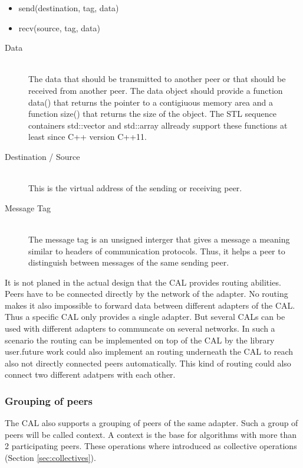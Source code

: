 \begin{itemize}
  \item send(destination, tag, data)
  \item recv(source, tag, data)
\end{itemize}

\begin{description}
\item[Data] \hfill \\
  The data that should be transmitted to
  another peer or that should be received from another peer.  The data
  object should provide a function data() that returns the pointer to a
  contigiuous memory area and a function size() that returns the size
  of the object. The STL sequence containers std::vector and
  std::array allready support these functions at least since C++ version
  C++11.
\item[Destination / Source] \hfill \\
  This is the virtual address of the sending or receiving peer.
\item[Message Tag] \hfill \\
  The message tag is an unsigned interger that gives
  a message a meaning similar to headers of communication
  protocols. Thus, it helps a peer to distinguish between messages of
  the same sending peer.
\end{description}

It is not planed in the actual design that the CAL provides routing
abilities. Peers have to be connected directly by the network of the
adapter. No routing makes it also impossible to forward data between
different adapters of the CAL. Thus a specific CAL only provides a
single adapter. But several CALs can be used with different adapters
to communcate on several networks. In such a scenario the routing can
be implemented on top of the CAL by the library user.future work could
also implement an routing underneath the CAL to reach also not
directly connected peers automatically. This kind of routing
could also connect two different adatpers with each other.

\subsubsection{Grouping of peers}
\label{sec:cal_context}
The CAL also supports a grouping of peers of the same adapter. Such a
group of peers will be called context. A context is the base for
algorithms with more than 2 participating peers. These operations
where introduced as collective operations (Section \ref{sec:collectives}). 

